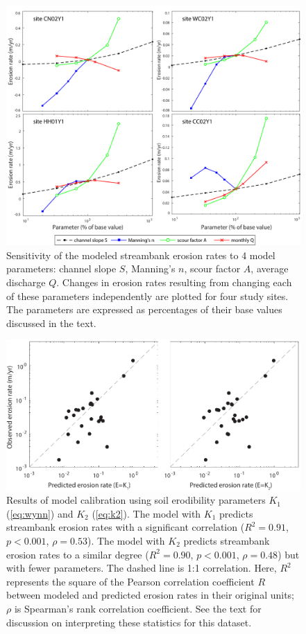 \documentclass[preprint, review, authoryear, 12pt]{elsarticle}
\begin{document}
\begin{figure}
\centering
\hspace*{-.5in}
\includegraphics[width=6in]{figs/sensitivity.pdf}
\caption{Sensitivity of the modeled streambank erosion rates to 4 model parameters: channel slope $S$, Manning's $n$, scour factor $A$, average discharge $Q$. Changes in erosion rates resulting from changing each of these parameters independently are plotted for four study sites. The parameters are expressed as percentages of their base values discussed in the text.}\label{fig:sensitivity}
\end{figure}

\begin{figure}
\centering
\includegraphics[width=1\textwidth]{figs/k1-vs-k2.pdf}
\caption[Results of model calibration]{Results of model calibration using soil erodibility parameters $K_1$ (\cref{eq:wynn}) and $K_2$ (\cref{eq:k2}). The model with $K_1$ predicts streambank erosion rates with a significant correlation ($R^2=0.91$, $p<0.001$, $\rho=0.53$). The model with $K_2$ predicts streambank erosion rates to a similar degree ($R^2=0.90$, $p<0.001$, $\rho=0.48$) but with fewer parameters. The dashed line is 1:1 correlation. Here, $R^2$ represents the square of the Pearson correlation coefficient $R$ between modeled and predicted erosion rates in their original units; $\rho$ is Spearman's rank correlation coefficient. See the text for discussion on interpreting these statistics for this dataset.} \label{fig:k1-vs-k2}
\end{figure}
\end{document}
